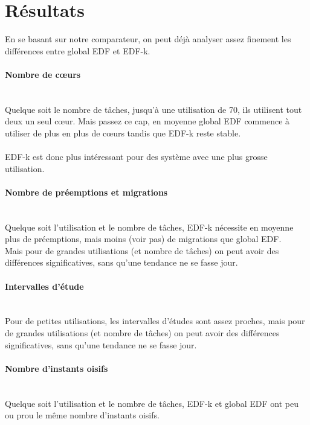 \documentclass[a4paper,10pt]{article}
\begin{document}
\section{Résultats}

 	En se basant sur notre comparateur, on peut déjà analyser assez finement les différences entre global EDF et EDF-k.\\
	
	\paragraph*{Nombre de cœurs}~\\
		Quelque soit le nombre de tâches, jusqu'à une utilisation de 70, ils utilisent tout deux un seul cœur.
		Mais passez ce cap, en moyenne global EDF commence à utiliser de plus en plus de cœurs tandis que EDF-k reste stable.\\
		~\\
		EDF-k est donc plus intéressant pour des système avec une plus grosse utilisation.
		
	\paragraph*{Nombre de préemptions et migrations}~\\

		Quelque soit l'utilisation et le nombre de tâches, EDF-k nécessite en moyenne plus de préemptions, mais moins (voir pas) de migrations que global EDF.\\
		Mais pour de grandes utilisations (et nombre de tâches) on peut avoir des différences significatives, sans qu'une tendance ne se fasse jour.
		
	\paragraph*{Intervalles d'étude}~\\
		Pour de petites utilisations, les intervalles d'études sont assez proches, mais pour de grandes utilisations (et nombre de tâches) on peut avoir des différences significatives, sans qu'une tendance ne se fasse jour.
		

	\paragraph*{Nombre d'instants oisifs}~\\
		Quelque soit l'utilisation et le nombre de tâches, EDF-k et global EDF ont peu ou prou le même nombre d'instants oisifs.
		
\end{document}
